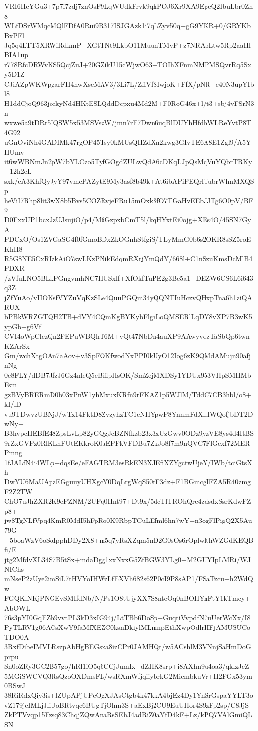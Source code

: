 VRI6HcYGu3+7p7i7zdj7znOsF9LqWUdkFrvk9qhPOJ6Xr9XA9EpeQ2IbuLbr0Zn8
WLfDSrWMqcMQlFDfA0Rui9R317ISJGAzk1i7qLZyv50q+gG9YKR+0/GRYKbBxPFl
Jq5q4LTT5XRWiRdkmP+XGtTNt9LkbO11MuunTMvP+z7NRAoLtw5Rp2aaHlBIA1up
r778RfcDRWvKS5QcjZuJ+20GZikU15cWjwO63+TOIhXFnmNMPMSQvrRq5Sxy5D1Z
CJiAZpWKWpgarFH4hwXseMAV3/3Li7L/ZffVfSIwjoK+FfX/pNR+e40N3upYIbl8
H1ddCjoQ963jcekyNd4HKtESLQddDepxu4Md2M+F0RoG46x+l/t3+sbj4vFSrN3n
wxwe5a9tDRr5IQSW5x53MSVszW/jmn7rF7Dwn6uqBlDUYhHfdbWLReYvtP8T4G92
uGnOviNh4GADIMk47rgOP45Tsy0kMUsQHZdXn2kwg3GIvTE6A8E1Zgl9/A5YHUmv
it6wWBNmJn2pW7bYLCzo5TyfGOgdZULwQdA6cDKqLJpQsMqVuYQbrTRKy+12h2eL
sxk/eA3KhfQyJyY97vmePAZytE9My3asf8b49k+At6ibAPiPEQrlTubrWhnMXQSp
heViI7Rhp8lit3wX8b5Bvs5COZRvjeFRu15mOxk8fO7TGaHvEEbJJTg6O0pV/BF9
D0FxxUP1bcxJzUJsujiO/p4/M6GzpxbCmT5l/kqHYxtEi0ojg+XEs4O/45SN7GyA
PDCxO/Os1ZVGaSG4f0fGmoBDxZkOGnhStfgiS/TLyMmG0b6s2OKR8sSZ5roEKhH8
R5G8NE5CxRIzkAiO7swLKzPNikEdqmRXrjYmQdY/668l+C1nSzuKmsDcMlB4PDXR
/zVfuLNO5BLkPGngvmhNC7HUSxlf+XfOkfTuPE2g3Be5a1+DEZW6CS6L6i643q3Z
jZfYuAo/vIIOKsfVYZuVqKzSLe4QuuPGQm34yQQNTIuHczvQHxpTna6h1ziQARUX
bPBkWRZGTQH2TB+dVY4CQmKgBYKybFlgrLoQMSERlLqDY8vXP7B3wK5ypGb+g6Vf
CVI4oWpClczQn2FEPuWBQhT6M+vQt47NbDn4auXP9AAwyvdzTaSbQp6twnKZArSx
Gm/wchXtgOAn7aAov+v3SpFOKfwodNxPPI0kUyO12Iog6zK9QMdAMujn90afjnNg
0e8FLY/dDB7JfzJ6Gz4nleQ5eBiflpHsOK/SmZejMXDSy1YDUx953VHpSMHMbFsm
gzBVyBRERmD0b03xPnW1yhMxuxKRfn9rFKAZ1p5WJlM/TddC7CB3hbl/o8+kI/lD
vu9TDwvzUBNjJ/wTx14FktD8ZvzyhzTC1cNHYpwP8YnnmFdXlHWQofjbDT2DwNy+
B3hvpcHEBfE48ZpsLvLp82yGQgJcBZNfkzb23x3xUzGwv0ODz9yzVE8ys4d4ItBS
9rZxGVPz0RlKLhFUtEKkroK0aEPFkVFDBu7ZkJo8f7m9nQVC7FlGexf72MERPmng
1fJALfN4i4WLp+dqsEe/eFAGTRM3esRkEN3XJEfiXZYgctwUjeY/IWb/tciGtsXh
DwYU6MaUApzEGguuyUHXgcY0DqLrgWqS50rF3dz+F1BGmcgIFZA5R40zmgF2Z2TW
ChO7uJhZXR2K9ePZNM/2UFq0Hnt97+Dt9x/5dcTlTROhQre4zdsdxSsrKdwFZp8+
jw8TgNLfVpq4KmR0MdI5hFpRo0K9RbpTCuLEfml6hn7wY+n3ogFlPigQ2X5Au79G
+5boaWzV6oSoIpphDDy2X8+m5q7yRsXZqm5nD2G0sOs6rOplwlthWZGdKEQBfi/E
jtg2MfdvXL34S7B5tSx+mdaDgg1xxNxxG5ZfBGW3YLg0+M2GUYIpLMRi/WJNIChs
mNseP2zUye2imSiL7tHVYoIHWzLfEXVh682s62P0cI9P8sAP1/FSaTzcu+h2WdQw
FGQKlNKjPNGEvSMIfdNb/N/Ps1O8tUjyXX7S8nteOq0nBOHYnFtY1kTmcy+AbOWL
76s3pYI0GqFZb9vvtPL3kD3xIG94j/LtTBb6DoSp+GuqtiVvpdfN7uUerWcXx/I8
PyTLRV1g06ACsXwY9faMfXEZC0ksnDkiylMLmnpEthXwpOdlrHFjAMUSUCoTDO0A
3RxfDibeIMVLRszpAbHgBEGsxa8izCPr0JAMHQt/w5ACshlM3VNnjSaHmDoGprpu
Sn0oZRy3GC2B57go/hRl1iO5q6CCjJumIx+dZHK8srp+i8AXhn9u4oa3/qklzJcZ
5MGiSWCVQ3RsQzoOXDmsFL/wsRXmWfjqiiybrkG2MicmbkuVr+H2FGx53ym0BSwJ
38RiRdxQiy3is+lZUpAPjUPcOgXJAsCtgb4k47kkA4bjEz4Dy1YnSrGspaYYLT3o
vZ179jcIMLjJliUoBRtvqc6BUgTjOhm3S+aExBj2CU9EuUHor4S9zFp2sp/C8JjS
ZkPTVvqp15Fzsq83ChqjZQwAnaRsSEhJ4adRiZ0aYfD4kF+Lz/kPQ7VAlGmiQLSN
